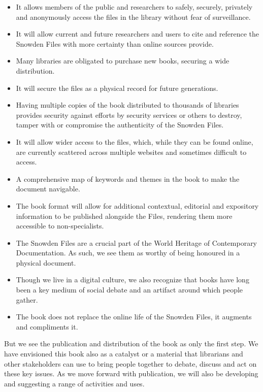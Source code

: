 \documentclass[a4paper,
fontsize=11pt,
oneside,
numbers=noperiodatend,
parskip=half-,
bibliography=totoc,
final
]{scrartcl}
\begin{document}
\begin{itemize}
\item
  It allows members of the public and researchers to safely, securely,
  privately and anonymously access the files in the library without fear
  of surveillance.
\item
  It will allow current and future researchers and users to cite and
  reference the Snowden Files with more certainty than online sources
  provide.
\item
  Many libraries are obligated to purchase new books, securing a wide
  distribution.
\item
  It will secure the files as a physical record for future generations.
\item
  Having multiple copies of the book distributed to thousands of
  libraries provides security against efforts by security services or
  others to destroy, tamper with or compromise the authenticity of the
  Snowden Files.
\item
  It will allow wider access to the files, which, while they can be
  found online, are currently scattered across multiple websites and
  sometimes difficult to access.
\item
  A comprehensive map of keywords and themes in the book to make the
  document navigable.
\item
  The book format will allow for additional contextual, editorial and
  expository information to be published alongside the Files, rendering
  them more accessible to non-specialists.
\item
  The Snowden Files are a crucial part of the World Heritage of
  Contemporary Documentation. As such, we see them as worthy of being
  honoured in a physical document.
\item
  Though we live in a digital culture, we also recognize that books have
  long been a key medium of social debate and an artifact around which
  people gather.
\item
  The book does not replace the online life of the Snowden Files, it
  augments and compliments it.
\end{itemize}

But we see the publication and distribution of the book as only the
first step. We have envisioned this book also as a catalyst or a
material that librarians and other stakeholders can use to bring people
together to debate, discuss and act on these key issues. As we move
forward with publication, we will also be developing and suggesting a
range of activities and uses.
\end{document}
